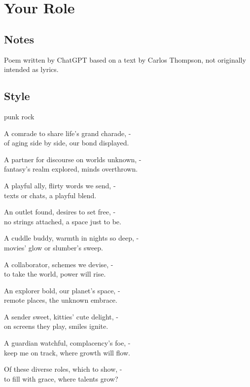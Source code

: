 \section{Your Role}

\subsection{Notes}
Poem written by ChatGPT based on a text by Carlos Thompson, not originally intended as lyrics.

\subsection{Style}
punk rock

\begin{lyrics}
A comrade to share life's grand charade, -\\
of aging side by side, our bond displayed.

A partner for discourse on worlds unknown, -\\
fantasy's realm explored, minds overthrown.

A playful ally, flirty words we send, -\\
texts or chats, a playful blend.

An outlet found, desires to set free, -\\
no strings attached, a space just to be.

A cuddle buddy, warmth in nights so deep, -\\
movies' glow or slumber's sweep.

A collaborator, schemes we devise, -\\
to take the world, power will rise.

An explorer bold, our planet's space, -\\
remote places, the unknown embrace.

A sender sweet, kitties' cute delight, -\\
on screens they play, smiles ignite.

A guardian watchful, complacency's foe, -\\
keep me on track, where growth will flow.

Of these diverse roles, which to show, -\\
to fill with grace, where talents grow?

\end{lyrics}

